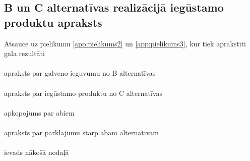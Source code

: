 \subsection{B un C alternatīvas realizācijā iegūstamo produktu apraksts}
Atsauce uz pielikumu \ref{app:pielikums2} un \ref{app:pielikums3}, kur tiek aprakstīti gala rezultāti
\paragraph{}
apraksts par galveno ieguvumu no B alternatīvas
\paragraph{}
apraksts par iegūstamo produktu no C alternatīvas
\paragraph{}
apkopojums par abiem
\paragraph{}
apraksts par pārklājumu starp abām alternatīvām
\paragraph{}
ievads nākošā nodaļā